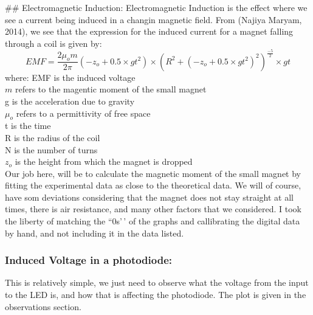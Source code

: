 \documentclass{../_layouts/ieeeconf}
\begin{document}
\#\# Electromagnetic Induction:
Electromagnetic Induction is the effect where we see a current being induced in a changin magnetic field. From (Najiya Maryam, 2014), we see that the expression for the induced current for a magnet falling through a coil is given by:
\[ EMF = \frac{2\mu_o m}{2\pi}(-z_o+0.5\times gt^2) \times (R^2+(-z_o+0.5\times gt^2)^2)^\frac{-5}{2}\times gt \]
where:
EMF is the induced voltage\\
\(m\) refers to the magentic moment of the small magnet\\
g is the acceleration due to gravity\\
\(\mu_o\) refers to a permittivity of free space\\
t is the time\\
R is the radius of the coil\\
N is the number of turns\\
\(z_o\) is the height from which the magnet is dropped\\
Our job here, will be to calculate the magnetic moment of the small magnet by fitting the experimental data as close to the theoretical data. We will of course, have som deviations considering that the magnet does not stay straight at all times, there is air resistance, and many other factors that we considered. I took the liberty of matching the ``0s'\,' of the graphs and callibrating the digital data by hand, and not including it in the data listed.

\subsubsection{Induced Voltage in a photodiode:}

This is relatively simple, we just need to observe what the voltage from the input to the LED is, and how that is affecting the photodiode. The plot is given in the observations section.
\end{document}
